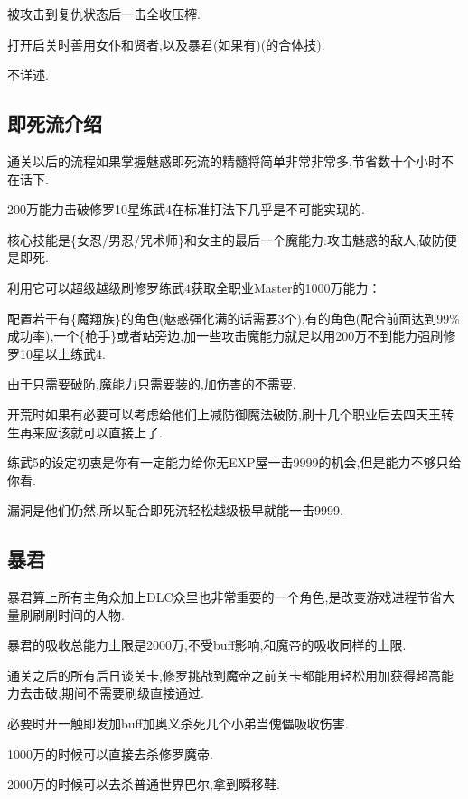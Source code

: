 	被攻击到复仇状态后一击全收压榨.

	打开启关时善用女仆和贤者,以及暴君(如果有)(的合体技).

	不详述.

	\subsection{即死流介绍}

	通关以后的流程如果掌握魅惑即死流的精髓将简单非常非常多,节省数十个小时不在话下.

	200万能力击破修罗10星练武4在标准打法下几乎是不可能实现的.

	核心技能是{\color{red}{魅惑魔法}}\{女忍/男忍/咒术师\}和女主的最后一个魔能力{\color{red}{生杀予夺}}:攻击魅惑的敌人,破防便是即死.

	利用它可以超级越级刷修罗练武4获取全职业Master的1000万能力：

	配置若干有{\color{red}{瘴气蔓延}}\{魔翔族\}的角色(魅惑强化满的话需要3个),有{\color{red}{强化9/范围9/魅惑}}的角色(配合前面达到99\%成功率),一个{\color{red}{辅助}}\{枪手\}或者{\color{red}{克里斯多}}站旁边,加一些攻击魔能力就足以用200万不到能力强刷修罗10星以上练武4.

	由于只需要破防,魔能力只需要装{\color{red}{加数值加攻击}}的,加伤害的不需要.

	开荒时如果有必要可以考虑给他们上减防御魔法破防,刷十几个职业后去四天王转生再来应该就可以直接上了.

	练武5的设定初衷是你有一定能力给你无EXP屋一击9999的机会,但是能力不够只给你看.

	漏洞是他们仍然{\color{red}{吃即死}}.所以配合即死流轻松越级极早就能一击9999.

	\subsection{暴君}

	暴君算上所有主角众加上DLC众里也非常重要的一个角色,是改变游戏进程节省大量刷刷刷时间的人物.

	暴君的吸收总能力上限是2000万,不受buff影响,和魔帝的吸收同样的上限.

	通关之后的所有后日谈关卡,修罗挑战到魔帝之前关卡都能用轻松用{\color{red}{即死流}}加{\color{red}{暴君吸收}}获得超高能力去击破,期间不需要刷级直接通过.

	必要时开一触即发加buff加奥义杀死几个小弟当傀儡吸收伤害.

	1000万的时候可以直接去杀修罗魔帝.

	2000万的时候可以去杀普通世界巴尔,拿到瞬移鞋.

